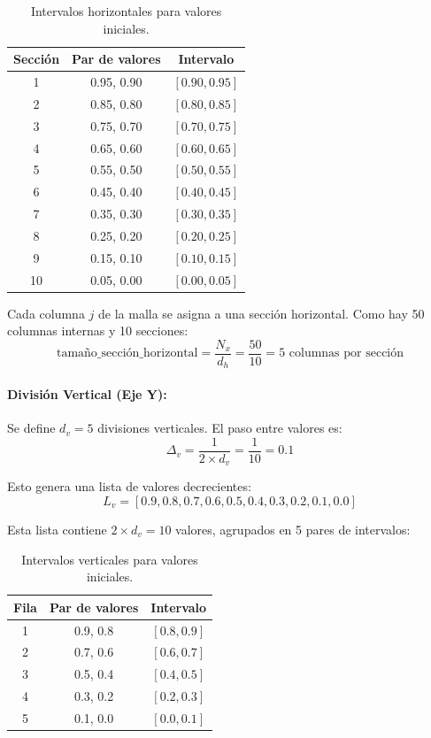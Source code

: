 \documentclass[11pt,letterpaper]{article}
\begin{document}
\begin{table}[h]
\centering
\begin{tabular}{|c|c|c|}
\hline
\textbf{Sección} & \textbf{Par de valores} & \textbf{Intervalo} \\
\hline
1 & 0.95, 0.90 & $[0.90, 0.95]$ \\
2 & 0.85, 0.80 & $[0.80, 0.85]$ \\
3 & 0.75, 0.70 & $[0.70, 0.75]$ \\
4 & 0.65, 0.60 & $[0.60, 0.65]$ \\
5 & 0.55, 0.50 & $[0.50, 0.55]$ \\
6 & 0.45, 0.40 & $[0.40, 0.45]$ \\
7 & 0.35, 0.30 & $[0.30, 0.35]$ \\
8 & 0.25, 0.20 & $[0.20, 0.25]$ \\
9 & 0.15, 0.10 & $[0.10, 0.15]$ \\
10 & 0.05, 0.00 & $[0.00, 0.05]$ \\
\hline
\end{tabular}
\caption{Intervalos horizontales para valores iniciales.}
\end{table}

Cada columna $j$ de la malla se asigna a una sección horizontal. Como hay 50 columnas internas y 10 secciones:
\[
\text{tamaño\_sección\_horizontal} = \frac{N_x}{d_h} = \frac{50}{10} = 5 \text{ columnas por sección}
\]

\paragraph{División Vertical (Eje Y):}
Se define $d_v = 5$ divisiones verticales. El paso entre valores es:
\[
\Delta_v = \frac{1}{2 \times d_v} = \frac{1}{10} = 0.1
\]

Esto genera una lista de valores decrecientes:
\[
L_v = [0.9, 0.8, 0.7, 0.6, 0.5, 0.4, 0.3, 0.2, 0.1, 0.0]
\]

Esta lista contiene $2 \times d_v = 10$ valores, agrupados en 5 pares de intervalos:

\begin{table}[h]
\centering
\begin{tabular}{|c|c|c|}
\hline
\textbf{Fila} & \textbf{Par de valores} & \textbf{Intervalo} \\
\hline
1 & 0.9, 0.8 & $[0.8, 0.9]$ \\
2 & 0.7, 0.6 & $[0.6, 0.7]$ \\
3 & 0.5, 0.4 & $[0.4, 0.5]$ \\
4 & 0.3, 0.2 & $[0.2, 0.3]$ \\
5 & 0.1, 0.0 & $[0.0, 0.1]$ \\
\hline
\end{tabular}
\caption{Intervalos verticales para valores iniciales.}
\end{table}
\end{document}
